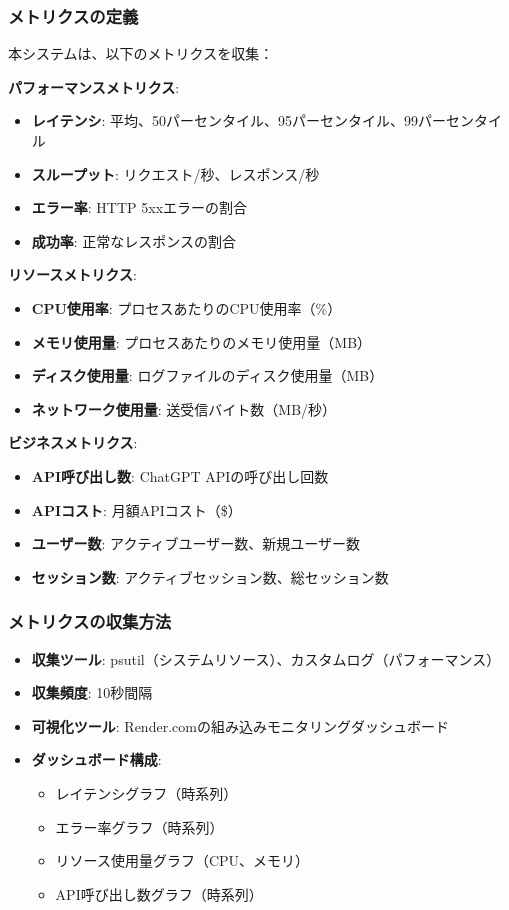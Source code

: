 \documentclass[a4paper,11pt,ja=standard,xelatex]{bxjsarticle}
\theoremstyle{definition}
\begin{document}
\subsubsection{メトリクスの定義}

本システムは、以下のメトリクスを収集：

\textbf{パフォーマンスメトリクス}:
\begin{itemize}
\item \textbf{レイテンシ}: 平均、50パーセンタイル、95パーセンタイル、99パーセンタイル
\item \textbf{スループット}: リクエスト/秒、レスポンス/秒
\item \textbf{エラー率}: HTTP 5xxエラーの割合
\item \textbf{成功率}: 正常なレスポンスの割合
\end{itemize}

\textbf{リソースメトリクス}:
\begin{itemize}
\item \textbf{CPU使用率}: プロセスあたりのCPU使用率（\%）
\item \textbf{メモリ使用量}: プロセスあたりのメモリ使用量（MB）
\item \textbf{ディスク使用量}: ログファイルのディスク使用量（MB）
\item \textbf{ネットワーク使用量}: 送受信バイト数（MB/秒）
\end{itemize}

\textbf{ビジネスメトリクス}:
\begin{itemize}
\item \textbf{API呼び出し数}: ChatGPT APIの呼び出し回数
\item \textbf{APIコスト}: 月額APIコスト（\$）
\item \textbf{ユーザー数}: アクティブユーザー数、新規ユーザー数
\item \textbf{セッション数}: アクティブセッション数、総セッション数
\end{itemize}

\subsubsection{メトリクスの収集方法}

\begin{itemize}
\item \textbf{収集ツール}: psutil（システムリソース）、カスタムログ（パフォーマンス）
\item \textbf{収集頻度}: 10秒間隔
\item \textbf{可視化ツール}: Render.comの組み込みモニタリングダッシュボード
\item \textbf{ダッシュボード構成}: 
  \begin{itemize}
  \item レイテンシグラフ（時系列）
  \item エラー率グラフ（時系列）
  \item リソース使用量グラフ（CPU、メモリ）
  \item API呼び出し数グラフ（時系列）
  \end{itemize}
\end{itemize}
\end{document}

